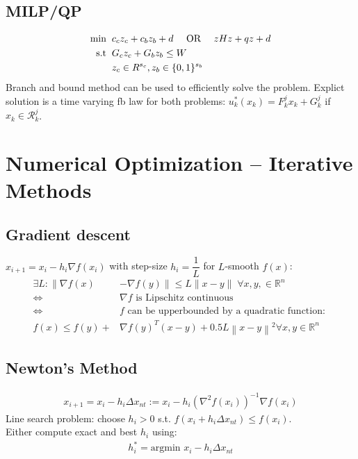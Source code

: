 \documentclass[landscape,a4paper,8pt]{scrartcl}
\renewcommand{\iff}{\Leftrightarrow}
\newcommand{\mc}[1]{\mathcal{#1}}
\newcommand{\R}{\mathbb R}
\begin{document}
\begin{multicols*}{3}
\subsection{MILP/QP}
\begin{align*}
	\text{min}  \hspace*{2mm} &c_c z_c +  c_b z_b + d \quad \text{ OR } \quad z H z +  q z + d\\
	\mathrm{s.t} \hspace*{2mm} &G_c z_c + G_b z_b \leq W \\
	&z_c \in R^{s_c}, z_b \in\{0, 1\}^{s_b}
\end{align*}
Branch and bound method can be used to efficiently solve the problem.
Explict solution is a time varying fb law for both problems: $u_k^*(x_k) = F^j_k x_k + G_k^j$ if $x_k \in \mc{R}^j_k$.

\section{Numerical Optimization -- Iterative Methods}
\subsection{Gradient descent}
$x_{i+1} = x_i - h_i\nabla f(x_i)$ with step-size $h_i = \dfrac{1}{L}$ for
$L$-smooth $f(x)$:
\begin{align*}
\exists L: \lVert \nabla f(x) &- \nabla f(y) \rVert \leq L \lVert x - y \rVert \; \forall x, y, \in \R^n \\
\iff & \nabla f \text{ is Lipschitz continuous} \\
\iff & f \text{ can be upperbounded by a quadratic function: } \\
f(x) \le f(y) + &\nabla f(y)^T(x - y)+ 0.5L\left\| x-y\right\|^2 \forall x, y \in\R^n
\end{align*}

\subsection{Newton's Method}
\begin{align*}
x_{i+1} = x_i - h_i\Delta x_{nt} := x_i - h_i (\nabla^2 f(x_i))^{-1} \nabla f(x_i)
\end{align*}
Line search problem: choose $h_i > 0$ s.t. $f(x_i + h_i\Delta x_{nt}) \leq f(x_i)$. \\
Either compute exact and best $h_i$ using:
\begin{align*}
h_i^* = \text{argmin } x_i - h_i\Delta x_{nt}
\end{align*}


\end{multicols*}
\end{document}
